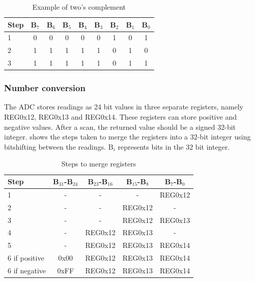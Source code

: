 \documentclass[12pt, a4paper]{article}
\begin{document}
                \begin{table}[h!]
                    \centering
                    \caption{Example of two's complement}
                    \vspace{0.2cm}               
                    \begin{tabular}{l|c c c c c c c c}
                        \textbf{Step}& B$_7$ & B$_6$ & B$_5$ & B$_4$ & B$_3$ & B$_2$ & B$_1$ & B$_0$ \\
                        \hline
                        1&0&0&0&0&0&1&0&1\\ 
                        2&1&1&1&1&1&0&1&0\\
                        3&1&1&1&1&1&0&1&1\\
                    \end{tabular}
                    \label{tab:bits}
                \end{table}

            \subsubsection{Number conversion}
            The ADC stores readings as 24 bit values in three separate registers, namely REG0x12, REG0x13 and REG0x14. These registers
            can store positive and negative values. After a scan, the returned value should be a signed 32-bit integer. 
            shows the steps taken to merge the registers into a 32-bit integer using bitshifting between the readings.
            B$_i$ represents bits in the 32 bit integer.

            \begin{table}[h]
                \centering
                \caption{Steps to merge registers}
                \vspace{0.2cm}               
                \begin{tabular}{l|c c c c}
                    \textbf{Step} & B$_{31}$-B$_{24}$ & B$_{23}$-B$_{16}$ & B$_{15}$-B$_8$ & B$_7$-B$_0$ \\
                    \hline
                    1 & - & - & - & REG0x12 \\
                    2 & - & - & REG0x12 & - \\
                    3 & - & - & REG0x12 & REG0x13 \\
                    4 & - & REG0x12 & REG0x13 & - \\
                    5 & - & REG0x12 & REG0x13 & REG0x14 \\
                    6 if positive & 0x00 & REG0x12 & REG0x13 & REG0x14 \\
                    6 if negative & 0xFF & REG0x12 & REG0x13 & REG0x14 \\

                \end{tabular}
                \label{tab:steps}
            \end{table}
\end{document}
